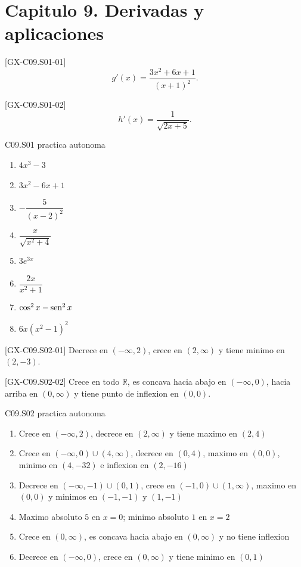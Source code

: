 \section*{Capitulo 9. Derivadas y aplicaciones}

\begin{shortanswer}{[GX-C09.S01-01]}
\[
g'(x)=\frac{3x^2+6x+1}{(x+1)^2}.
\]
\end{shortanswer}

\begin{shortanswer}{[GX-C09.S01-02]}
\[
h'(x)=\frac{1}{\sqrt{2x+5}}.
\]
\end{shortanswer}

\begin{shortanswer}{C09.S01 practica autonoma}
\begin{enumerate}[label=\textbf{PX-C09.S01-\arabic*:}, leftmargin=*]
  \item \(4x^3-3\)
  \item \(3x^2-6x+1\)
  \item \(-\dfrac{5}{(x-2)^2}\)
  \item \(\dfrac{x}{\sqrt{x^2+4}}\)
  \item \(3e^{3x}\)
  \item \(\dfrac{2x}{x^2+1}\)
  \item \(\cos^2 x-\operatorname{sen}^2 x\)
  \item \(6x(x^2-1)^2\)
\end{enumerate}
\end{shortanswer}

\begin{shortanswer}{[GX-C09.S02-01]}
Decrece en \((-\infty,2)\), crece en \((2,\infty)\) y tiene minimo en \((2,-3)\).
\end{shortanswer}

\begin{shortanswer}{[GX-C09.S02-02]}
Crece en todo \(\mathbb{R}\), es concava hacia abajo en \((-\infty,0)\), hacia arriba en
\((0,\infty)\) y tiene punto de inflexion en \((0,0)\).
\end{shortanswer}

\begin{shortanswer}{C09.S02 practica autonoma}
\begin{enumerate}[label=\textbf{PX-C09.S02-\arabic*:}, leftmargin=*]
  \item Crece en \((-\infty,2)\), decrece en \((2,\infty)\) y tiene maximo en \((2,4)\)
  \item Crece en \((-\infty,0)\cup(4,\infty)\), decrece en \((0,4)\), maximo en \((0,0)\),
  minimo en \((4,-32)\) e inflexion en \((2,-16)\)
  \item Decrece en \((-\infty,-1)\cup(0,1)\), crece en \((-1,0)\cup(1,\infty)\), maximo en
  \((0,0)\) y minimos en \((-1,-1)\) y \((1,-1)\)
  \item Maximo absoluto \(5\) en \(x=0\); minimo absoluto \(1\) en \(x=2\)
  \item Crece en \((0,\infty)\), es concava hacia abajo en \((0,\infty)\) y no tiene inflexion
  \item Decrece en \((-\infty,0)\), crece en \((0,\infty)\) y tiene minimo en \((0,1)\)
\end{enumerate}
\end{shortanswer}

